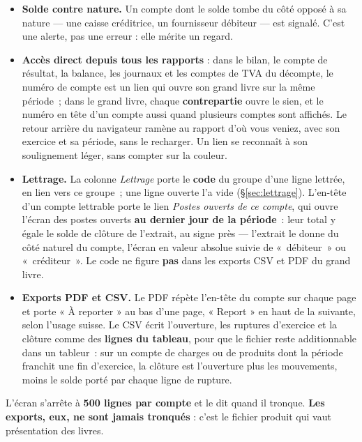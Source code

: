 \documentclass[a4paper,11pt,oneside]{article}
\begin{document}
\begin{itemize}
          précisément l'anomalie que l'on cherche.
    \item \textbf{Solde contre nature.} Un compte dont le solde tombe du côté opposé à sa nature
          — une caisse créditrice, un fournisseur débiteur — est signalé. C'est une alerte, pas
          une erreur : elle mérite un regard.
    \item \textbf{Accès direct depuis tous les rapports} : dans le bilan, le compte de résultat, la
          balance, les journaux et les comptes de TVA du décompte, le numéro de compte est un lien
          qui ouvre son grand livre sur la même période~; dans le grand livre, chaque
          \textbf{contrepartie} ouvre le sien, et le numéro en tête d'un compte aussi quand plusieurs
          comptes sont affichés. Le retour arrière du navigateur ramène au rapport d'où vous veniez,
          avec son exercice et sa période, sans le recharger. Un lien se reconnaît à son
          soulignement léger, sans compter sur la couleur.
    \item \textbf{Lettrage.} La colonne \emph{Lettrage} porte le \textbf{code} du groupe d'une
          ligne lettrée, en lien vers ce groupe~; une ligne ouverte l'a vide
          (\S\ref{sec:lettrage}). L'en-tête d'un compte lettrable porte le lien
          \emph{Postes ouverts de ce compte}, qui ouvre l'écran des postes ouverts \textbf{au
          dernier jour de la période}~: leur total y égale le solde de clôture de l'extrait, au
          signe près --- l'extrait le donne du côté naturel du compte, l'écran en valeur absolue
          suivie de «~débiteur~» ou «~créditeur~». Le code ne figure \textbf{pas} dans les
          exports CSV et PDF du grand livre.
    \item \textbf{Exports PDF et CSV.} Le PDF répète l'en-tête du compte sur chaque page et
          porte « À reporter » au bas d'une page, « Report » en haut de la suivante, selon
          l'usage suisse. Le CSV écrit l'ouverture, les ruptures d'exercice et la clôture comme
          des \textbf{lignes du tableau}, pour que le fichier reste additionnable dans un
          tableur~: sur un compte de charges ou de produits dont la période franchit une fin
          d'exercice, la clôture est l'ouverture plus les mouvements, moins le solde porté par
          chaque ligne de rupture.
\end{itemize}

\begin{keshnote}
L'écran s'arrête à \textbf{500 lignes par compte} et le dit quand il tronque. \textbf{Les
exports, eux, ne sont jamais tronqués} : c'est le fichier produit qui vaut présentation des
livres.
\end{keshnote}
\end{document}
